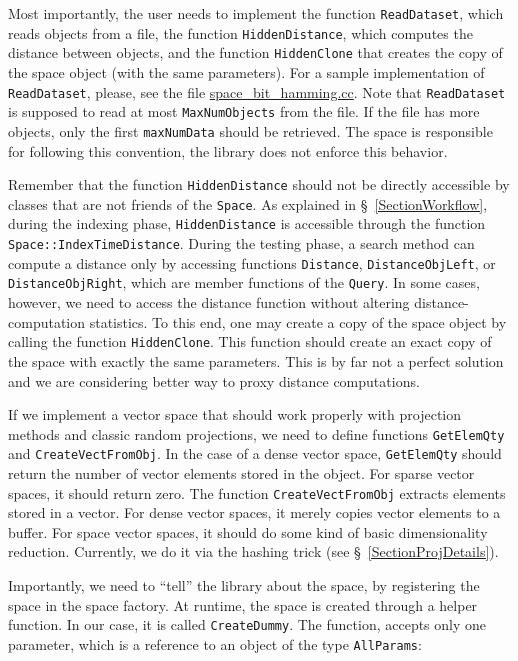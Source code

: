 \documentclass[runningheads,a4paper]{llncs}
\newcommand{\replocfile}{https://github.com/searchivarius/NonMetricSpaceLib/blob/develop/}
\newcommand{\ttt}[1]{\texttt{#1}}
\begin{document}
Most importantly, the user needs to implement the function \ttt{ReadDataset},
which reads objects from a file, the function \ttt{HiddenDistance},
which computes the distance between objects,
and the function \ttt{HiddenClone} that creates the copy of the space object (with the same parameters).
For a sample implementation of \ttt{ReadDataset},
please, see the file
\href{\replocfile similarity_search/src/space/space_bit_hamming.cc}{space\_bit\_hamming.cc}.
Note that \ttt{ReadDataset} is supposed to read at most \ttt{MaxNumObjects}
from the file. If the file has more objects, only the first \ttt{maxNumData} should be retrieved.
The space is responsible for following this convention, the library does not enforce this behavior.

Remember that the function \ttt{HiddenDistance} should not be directly accessible 
by classes that are not friends of the \ttt{Space}.
As explained in \S~\ref{SectionWorkflow},
during the indexing phase, 
\ttt{HiddenDistance} is accessible through the function
\ttt{Space::IndexTimeDistance}.
During the testing phase, a search method can compute a distance
only by accessing functions \ttt{Distance}, \ttt{DistanceObjLeft}, or
\ttt{DistanceObjRight}, which are member functions of the \ttt{Query}.
In some cases, however, we need to access the distance function without
altering distance-computation statistics. To this end, one may create
a copy of the space object by calling the function \ttt{HiddenClone}. 
This function should create an exact copy of the space with exactly
the same parameters.
This is by far not a perfect solution and we are considering better
way to proxy distance computations. 

If we implement a vector space that should work properly with projection methods
and classic random projections, we need to define functions \ttt{GetElemQty} and \ttt{CreateVectFromObj}. 
In the case of a dense vector space, \ttt{GetElemQty}
should return the number of vector elements stored in the object.
For sparse vector spaces, it should return zero. The function \ttt{CreateVectFromObj}
extracts elements stored in a vector. For dense vector spaces,
it merely copies vector elements to a buffer. For space vector spaces,
it should do some kind of basic dimensionality reduction. 
Currently, we do it via the hashing trick (see \S~\ref{SectionProjDetails}).

Importantly, we need to ``tell'' the library about the space,
by registering the space in the space factory.
At runtime, the space is created through a helper function.
In our case, it is called \ttt{CreateDummy}.
The function, accepts only one parameter,
which is a reference to an object of the type \ttt{AllParams}:
\end{document}
